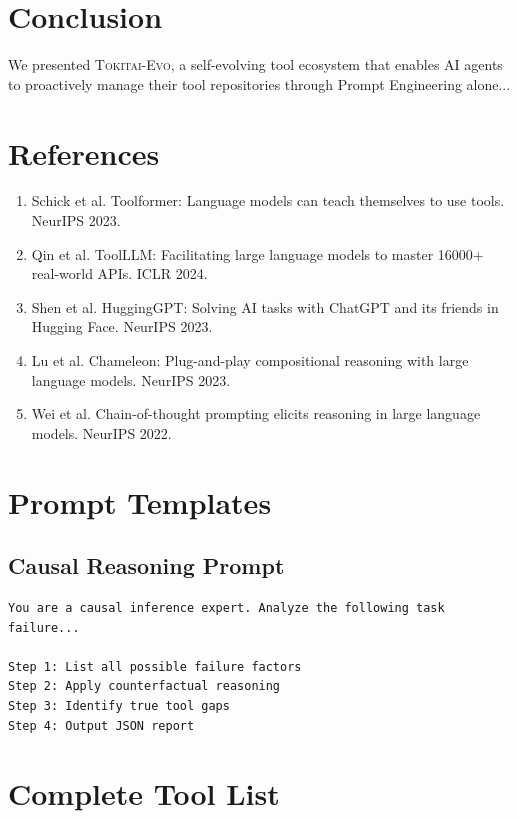 \documentclass[11pt]{article}
\newcommand{\ours}{\textsc{Tokitai-Evo}\xspace}
\begin{document}
\section{Conclusion}\label{sec:conclusion}

We presented \ours, a self-evolving tool ecosystem that enables AI agents to proactively manage their tool repositories through Prompt Engineering alone...

\section*{References}
\begin{enumerate}
    \item Schick et al. Toolformer: Language models can teach themselves to use tools. NeurIPS 2023.
    \item Qin et al. ToolLLM: Facilitating large language models to master 16000+ real-world APIs. ICLR 2024.
    \item Shen et al. HuggingGPT: Solving AI tasks with ChatGPT and its friends in Hugging Face. NeurIPS 2023.
    \item Lu et al. Chameleon: Plug-and-play compositional reasoning with large language models. NeurIPS 2023.
    \item Wei et al. Chain-of-thought prompting elicits reasoning in large language models. NeurIPS 2022.
\end{enumerate}

\appendix
\section{Prompt Templates}\label{app:prompts}

\subsection{Causal Reasoning Prompt}

\begin{verbatim}
You are a causal inference expert. Analyze the following task failure...

Step 1: List all possible failure factors
Step 2: Apply counterfactual reasoning
Step 3: Identify true tool gaps
Step 4: Output JSON report
\end{verbatim}

\section{Complete Tool List}\label{app:tools}
\end{document}
